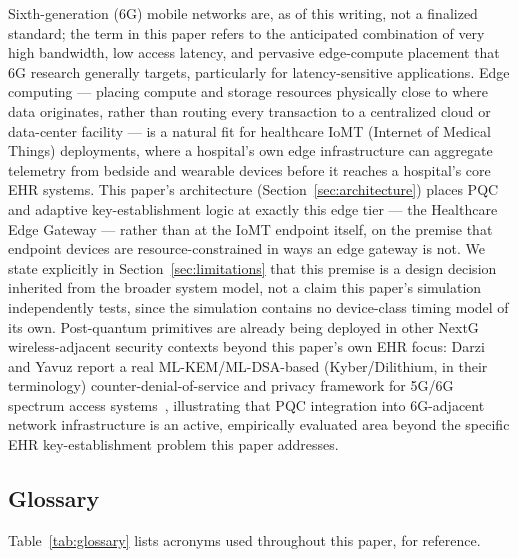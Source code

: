 \documentclass[journal]{IEEEtran}
\begin{document}
Sixth-generation (6G) mobile networks are, as of this writing, not a finalized standard; the term in this paper refers to the anticipated combination of very high bandwidth, low access latency, and pervasive edge-compute placement that 6G research generally targets, particularly for latency-sensitive applications. Edge computing --- placing compute and storage resources physically close to where data originates, rather than routing every transaction to a centralized cloud or data-center facility --- is a natural fit for healthcare IoMT (Internet of Medical Things) deployments, where a hospital's own edge infrastructure can aggregate telemetry from bedside and wearable devices before it reaches a hospital's core EHR systems. This paper's architecture (Section~\ref{sec:architecture}) places PQC and adaptive key-establishment logic at exactly this edge tier --- the Healthcare Edge Gateway --- rather than at the IoMT endpoint itself, on the premise that endpoint devices are resource-constrained in ways an edge gateway is not. We state explicitly in Section~\ref{sec:limitations} that this premise is a design decision inherited from the broader system model, not a claim this paper's simulation independently tests, since the simulation contains no device-class timing model of its own. Post-quantum primitives are already being deployed in other NextG wireless-adjacent security contexts beyond this paper's own EHR focus: Darzi and Yavuz report a real ML-KEM/ML-DSA-based (Kyber/Dilithium, in their terminology) counter-denial-of-service and privacy framework for 5G/6G spectrum access systems~\cite{darzi2024counterdos}, illustrating that PQC integration into 6G-adjacent network infrastructure is an active, empirically evaluated area beyond the specific EHR key-establishment problem this paper addresses.

\subsection{Glossary}

Table~\ref{tab:glossary} lists acronyms used throughout this paper, for reference.
\end{document}
